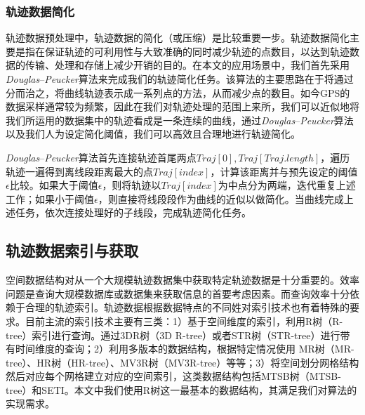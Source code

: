 \subsubsection{轨迹数据简化}
\label{subsubsec:trajectory simplification}
轨迹数据预处理中，轨迹数据的简化（或压缩）是比较重要一步。轨迹数据简化主要是指在保证轨迹的可利用性与大致准确的同时减少轨迹的点数目，以达到轨迹数据的传输、处理和存储上减少开销的目的。在本文的应用场景中，我们首先采用\emph{Douglas}–\emph{Peucker}算法\cite{visvalingam1990douglas}来完成我们的轨迹简化任务。该算法的主要思路在于将通过分而治之，将曲线轨迹表示成一系列点的方法，从而减少点的数目。如今GPS的数据采样通常较为频繁，因此在我们对轨迹处理的范围上来所，我们可以近似地将我们所运用的数据集中的轨迹看成是一条连续的曲线，通过\emph{Douglas}–\emph{Peucker}算法以及我们人为设定简化阈值，我们可以高效且合理地进行轨迹简化。


\emph{Douglas}–\emph{Peucker}算法首先连接轨迹首尾两点$Traj[0],Traj[Traj.length]$，遍历轨迹一遍得到离线段距离最大的点$Traj[index]$，计算该距离并与预先设定的阈值$\epsilon$比较。如果大于阈值$\epsilon$，则将轨迹以$Traj[index]$为中点分为两端，迭代重复上述工作；如果小于阈值$\epsilon$，则直接将线段段作为曲线的近似以做简化。当曲线完成上述任务，依次连接处理好的子线段，完成轨迹简化任务。

\subsection{轨迹数据索引与获取}
\label{subsec:index}
空间数据结构对从一个大规模轨迹数据集中获取特定轨迹数据是十分重要的。效率问题是查询大规模数据库或数据集来获取信息的首要考虑因素。而查询效率十分依赖于合理的轨迹索引。轨迹数据根据数据特点的不同姓对索引技术也有着特殊的要求。目前主流的索引技术主要有三类：1）基于空间维度的索引，利用R树（R-tree）索引进行查询。通过3DR树（3D R-tree）或者STR树（STR-tree）进行带有时间维度的查询；2）利用多版本的数据结构，根据特定情况使用 MR树（MR-tree）、HR树（HR-tree）、MV3R树（MV3R-tree）等等；3）将空间划分网格结构然后对应每个网格建立对应的空间索引，这类数据结构包括MTSB树（MTSB-tree）和SETI。本文中我们使用R树这一最基本的数据结构，其满足我们对算法的实现需求。

